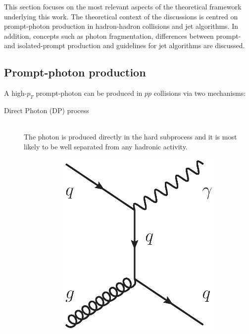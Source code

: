 \documentclass[12pt, twoside]{article}
\numberwithin{equation}{section}
\numberwithin{figure}{section}
\begin{document}
This section focuses on the most relevant aspects of the theoretical framework underlying this work. The theoretical context of the discussions is centred on prompt-photon production in hadron-hadron collisions and jet algorithms. In addition, concepts such as photon fragmentation, differences between prompt- and isolated-prompt production and guidelines for jet algorithms are discussed.

\subsection{Prompt-photon production}
\label{subsec:PromptPhotonProduction}

A high-$p_{T}$ prompt-photon can be produced in $pp$ collisions via two mechanisms:
\begin{description}
    \item[Direct Photon (DP) process] \hfil \\
    The photon is produced directly in the hard subprocess and it is most likely to be well separated from any hadronic activity.
    \begin{figure}[h]
        \centering
        \begin{subfigure}[b]{0.25\textwidth}
            \includegraphics[width=\textwidth]{./images/D_LO_Feynman.eps}

\end{subfigure}
\end{figure}
\end{description}
\end{document}
